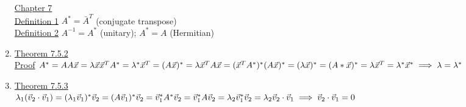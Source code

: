 \documentclass[12pt]{amsart}
\begin{document}
\begin{enumerate}
\underline{Chapter 7}\\
\underline{Definition 1} $A^* = \bar{A}^T$ (conjugate transpose)\\
\underline{Definition 2} $A^{-1} = A^*$ (unitary);$\,\, A^* = A$ (Hermitian)\\
\item \underline{Theorem 7.5.2} \\
\underline{Proof}
$A^* = A  A \vec{x} = \lambda \vec{x} \\
\vec{x}^T A^* = \lambda^* \vec{x}^T = (A \vec{x})^* = \lambda \vec{x}^T\\
A \vec{x} = (\vec{x}^T A^*)^*\\
(A\vec{x})^* = (\lambda \vec{x})^* = (A* \vec{x})^* = \lambda \vec{x}^T = \lambda^* \vec{x}^* \implies \lambda = \lambda^*\\$
\item \underline{Theorem 7.5.3}\\
$\lambda_1 (\vec{v}_2 \cdot \vec{v}_1) = (\lambda_1 \vec{v}_1)^* \vec{v}_2 = (A \vec{v}_1)^* \vec{v}_2 = \vec{v}_1^* A^* \vec{v}_2 = \vec{v}_1^* A \vec{v}_2\\
= \lambda_2 \vec{v}_1^* \vec{v}_2 = \lambda_2 \vec{v}_2 \cdot \vec{v}_1 \implies \vec{v}_2 \cdot \vec{v}_1 = 0\\$


\hdashrule[0.5ex][c]{\linewidth}{0.5pt}{1.5mm}



\end{enumerate}
\end{document}
